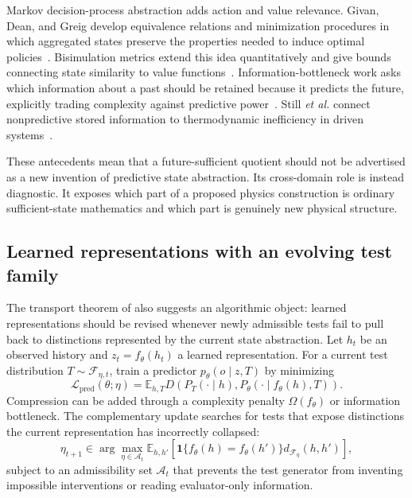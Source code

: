 \documentclass[11pt]{article}
\newcommand{\F}{\mathcal F}
\begin{document}
Markov decision-process abstraction adds action and value relevance. Givan, Dean, and Greig develop equivalence relations and minimization procedures in which aggregated states preserve the properties needed to induce optimal policies~\cite{givan2003}. Bisimulation metrics extend this idea quantitatively and give bounds connecting state similarity to value functions~\cite{ferns2011}. Information-bottleneck work asks which information about a past should be retained because it predicts the future, explicitly trading complexity against predictive power~\cite{tishby1999,creutzig2009}. Still \emph{et al.} connect nonpredictive stored information to thermodynamic inefficiency in driven systems~\cite{still2012}.

These antecedents mean that a future-sufficient quotient should not be advertised as a new invention of predictive state abstraction. Its cross-domain role is instead diagnostic. It exposes which part of a proposed physics construction is ordinary sufficient-state mathematics and which part is genuinely new physical structure.

\subsection{Learned representations with an evolving test family}

The transport theorem of  also suggests an algorithmic object: learned representations should be revised whenever newly admissible tests fail to pull back to distinctions represented by the current state abstraction. Let $h_t$ be an observed history and $z_t=f_{\theta}(h_t)$ a learned representation. For a current test distribution $T\sim\F_{\eta,t}$, train a predictor $p_{\theta}(o\mid z,T)$ by minimizing
\begin{equation}
  \mathcal L_{\mathrm{pred}}(\theta;\eta)
  =
  \mathbb E_{h,T}
  D\!\left(
    P_T(\cdot\mid h),
    P_{\theta}(\cdot\mid f_{\theta}(h),T)
  \right).
  \label{eq:pred-loss}
\end{equation}
Compression can be added through a complexity penalty $\Omega(f_{\theta})$ or information bottleneck. The complementary update searches for tests that expose distinctions the current representation has incorrectly collapsed:
\begin{equation}
  \eta_{t+1}
  \in
  \arg\max_{\eta\in\mathcal A_t}
  \mathbb E_{h,h'}
  \left[
  \mathbf 1\{f_{\theta}(h)=f_{\theta}(h')\}
  d_{\F_{\eta}}(h,h')
  \right],
  \label{eq:test-search}
\end{equation}
subject to an admissibility set $\mathcal A_t$ that prevents the test generator from inventing impossible interventions or reading evaluator-only information.
\end{document}

